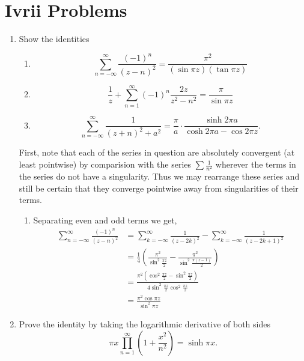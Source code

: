 \documentclass[letterpaper, 12pt]{article}
\begin{document}
\pagestyle{fancy}

\section{Ivrii Problems}
\begin{enumerate}
    \item
    Show the identities 
    \begin{enumerate}
        \item \[\sum_{n = -\infty}^\infty \frac{(-1)^n}{(z-n)^2} = \frac{\pi^2}{(\sin{\pi z})(\tan{\pi z})}\]
        \item \[\frac{1}{z} + \sum_{n=1}^\infty (-1)^n \frac{2z}{z^2 - n^2} = \frac{\pi}{\sin{\pi z}}\]
        \item \[\sum_{n=-\infty}^\infty \frac{1}{(z+n)^2 + a^2} = \frac{\pi}{a}\cdot \frac{\sinh{2\pi a}}{\cosh{2 \pi a} - \cos{2 \pi z}}.\]
    \end{enumerate}

    \begin{solution}
        First, note that each of the series in question are absolutely convergent (at least pointwise) by comparision with the series \(\sum \frac{1}{n^2}\) wherever the terms in the series do not have a singularity. Thus we may rearrange these series and still be certain that they converge pointwise away from singularities of their terms.
        \begin{enumerate}
            \item Separating even and odd terms we get,
            \begin{align*}
                \sum_{n=-\infty}^\infty \frac{(-1)^n}{(z-n)^2} &= \sum_{k=-\infty}^\infty \frac{1}{(z-2k)^2} - \sum_{k=-\infty}^\infty \frac{1}{(z-2k+1)^2} \\
                &= \frac{1}{4}\left( \frac{\pi^2}{\sin^2 \frac{\pi z}{2}} - \frac{\pi^2}{\sin^2 \frac{\pi (z-1)}{2}}\right) \\
                &=\frac{\pi^2 (\cos^2 \frac{\pi z}{2} - \sin^2 \frac{\pi z}{2})}{4 \sin^2 \frac{\pi z}{2} \cos^2 \frac{\pi z}{2} }\\
                &= \frac{\pi^2 \cos{\pi z}}{\sin^2 \pi z}
            \end{align*}
        \end{enumerate}
    
    \end{solution}

    \item
    Prove the identity by taking the logarithmic derivative of both sides
    \[ \pi x \prod_{n=1}^\infty \left(1 + \frac{x^2}{n^2}\right) = \sinh{\pi x}.\]


\end{enumerate}
\end{document}
